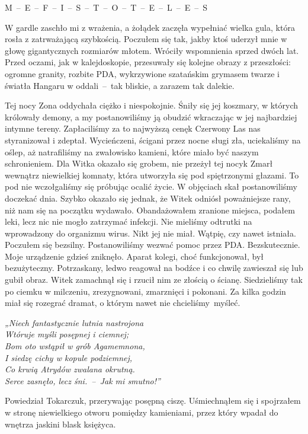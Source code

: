 \documentclass[../MAIN.tex]{subfiles}
\begin{document}
M~--~E~--~F~--~I~--~S~--~T~--~O~--~T~--~E~--~L~--~E~--~S

W gardle zaschło mi z wrażenia, a żołądek zaczęła wypełniać
wielka gula, która rosła z zatrważającą szybkością. Poczułem
się tak, jakby ktoś uderzył mnie w głowę gigantycznych
rozmiarów młotem. Wróciły wspomnienia sprzed dwóch lat. Przed
oczami, jak w kalejdoskopie, przesuwały się kolejne obrazy z
przeszłości: ogromne granity, rozbite PDA, wykrzywione
szatańskim grymasem twarze i światła Hangaru w oddali~--~tak
bliskie, a zarazem tak dalekie.

Tej nocy Zona oddychała ciężko i niespokojnie. Śniły się jej
koszmary, w których królowały demony, a my postanowiliśmy ją
obudzić wkraczając w jej najbardziej intymne tereny.
Zapłaciliśmy za to najwyższą cenę\3k Czerwony Las nas
styranizował i zdeptał. Wycieńczeni, ścigani przez nocne sługi
zła, uciekaliśmy na oślep, aż natrafiliśmy na zwałowisko
kamieni, które miało być naszym schronieniem. Dla Witka okazało
się grobem, nie przeżył tej nocy\3k Zmarł wewnątrz niewielkiej
komnaty, która utworzyła się pod spiętrzonymi głazami. To pod
nie wczołgaliśmy się próbując ocalić życie. W objęciach skał
postanowiliśmy doczekać dnia. Szybko okazało się jednak, że
Witek odniósł poważniejsze rany, niż nam się na początku
wydawało. Obandażowałem zranione miejsca, podałem leki, lecz
nic nie mogło zatrzymać infekcji. Nie mieliśmy odtrutki na
wprowadzony do organizmu wirus. Nikt jej nie miał. Wątpię, czy
nawet istniała. Poczułem się bezsilny. Postanowiliśmy wezwać
pomoc przez PDA. Bezskutecznie. Moje urządzenie gdzieś
zniknęło. Aparat kolegi, choć funkcjonował, był bezużyteczny.
Potrzaskany, ledwo reagował na bodźce i co chwilę zawieszał się
lub gubił obraz. Witek zamachnął się i rzucił nim ze złością o
ścianę. Siedzieliśmy tak po ciemku w milczeniu, zrezygnowani,
zmarznięci i pokonani. Za kilka godzin miał się rozegrać
dramat, o którym nawet nie chcieliśmy~myśleć.

\emph{„Niech fantastycznie lutnia nastrojona\\
Wtóruje myśli posępnej i ciemnej;\\
Bom oto wstąpił w grób Agamemnona,\\
I siedzę cichy w kopule podziemnej,\\
Co krwią Atrydów zwalana okrutną.\\
Serce zasnęło, lecz śni.~--~Jak mi smutno!”}

Powiedział Tokarczuk, przerywając posępną ciszę. Uśmiechnąłem
się i spojrzałem w stro\-nę niewielkiego otworu pomiędzy
kamieniami, przez który wpadał do wnętrza jaskini blask
księżyca.
\end{document}
